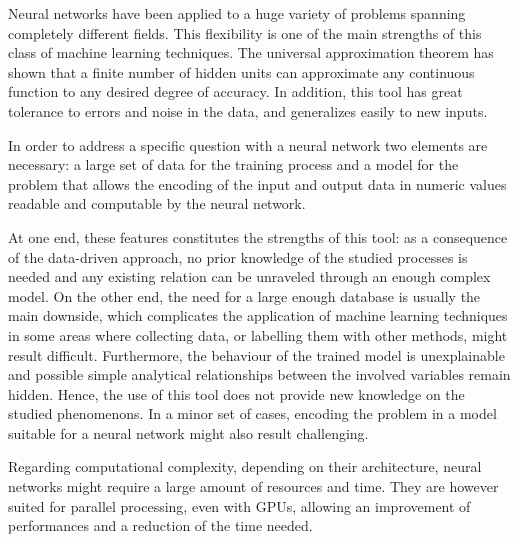 \documentclass[a4paper,10pt]{report}
\begin{document}
Neural networks have been applied to a huge variety of problems spanning completely different fields.
This flexibility is one of the main strengths of this class of machine learning techniques.
The universal approximation theorem has shown that 
a finite number of hidden units can approximate any continuous function to any desired degree of accuracy.
In addition, this tool has great tolerance to errors and noise in the data, and generalizes easily to
new inputs.

In order to address a specific question with a neural network two elements are necessary:
a large set of data for the training process and a model for the problem that allows
the encoding of the input and output data in numeric values readable and computable by the neural network.

At one end, these features constitutes the strengths of this tool:
as a consequence of the data-driven approach, no prior knowledge of
the studied processes is needed and any existing relation can be unraveled through
an enough complex model.
On the other end, the need for a large enough database is usually the main
downside, which complicates the application of machine learning techniques in some areas where
collecting data, or labelling them with other methods, might result difficult.
Furthermore, the behaviour of the trained model is unexplainable and 
possible simple analytical relationships between the involved variables remain hidden. 
Hence, the use of this tool does not provide new knowledge on the studied phenomenons.
In a minor set of cases, encoding the problem in a model suitable for a neural network might also
result challenging.

Regarding computational complexity, depending on their architecture, neural networks might require a
large amount of resources and time. They are however suited for parallel processing, even with GPUs, allowing
an improvement of performances and a reduction of the time needed.
\end{document}
